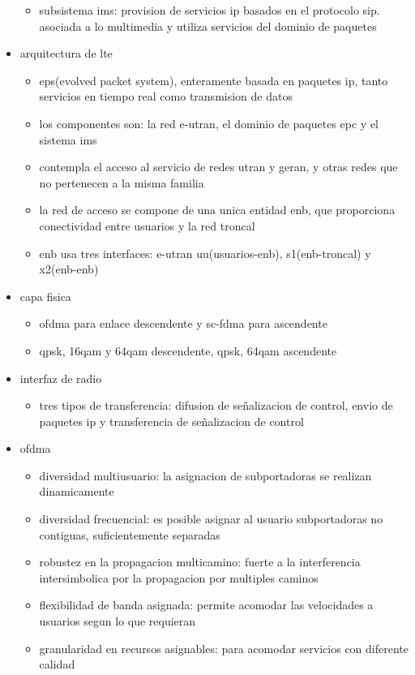 \documentclass[11pt]{article}
\begin{document}
\begin{itemize}
\begin{itemize}
\item subsistema ims: provision de servicios ip basados en el protocolo sip. asociada a lo multimedia y utiliza servicios del dominio de paquetes
\end{itemize}
\item arquitectura de lte
\begin{itemize}
\item eps(evolved packet system), enteramente basada en paquetes ip, tanto servicios en tiempo real como transmision de datos
\item los componentes son: la red e-utran, el dominio de paquetes epc y el sistema ims
\item contempla el acceso al servicio de redes utran y geran, y otras redes que no pertenecen a la misma familia
\item la red de acceso se compone de una unica entidad enb, que proporciona conectividad entre usuarios y la red troncal
\item enb usa tres interfaces: e-utran uu(usuarios-enb), s1(enb-troncal) y x2(enb-enb)
\end{itemize}
\item capa fisica
\begin{itemize}
\item ofdma para enlace descendente y sc-fdma para ascendente
\item qpsk, 16qam y 64qam descendente, qpsk, 64qam ascendente
\end{itemize}
\item interfaz de radio
\begin{itemize}
\item tres tipos de transferencia: difusion de señalizacion de control, envio de paquetes ip y transferencia de señalizacion de control
\end{itemize}
\item ofdma
\begin{itemize}
\item diversidad multiusuario: la asignacion de subportadoras se realizan dinamicamente
\item diversidad frecuencial: es posible asignar al usuario subportadoras no contiguas, suficientemente separadas
\item robustez en la propagacion multicamino: fuerte a la interferencia intersimbolica por la propagacion por multiples caminos
\item flexibilidad de banda asignada: permite acomodar las velocidades a usuarios segun lo que requieran
\item granularidad en recursos asignables: para acomodar servicios con diferente calidad

\end{itemize}
\end{itemize}
\end{document}
